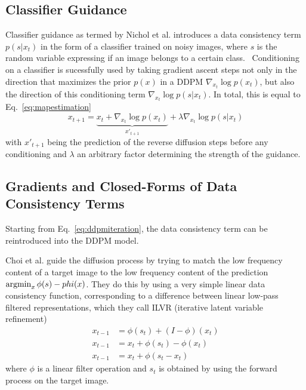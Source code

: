 \subsection{Classifier Guidance}
Classifier guidance as termed by Nichol et al. introduces a data consistency term $p(s|x_t)$ in the form of a classifier trained on noisy images, where $s$ is the random variable expressing if an image belongs to a certain class.~\autocite{dhariwal2021diffusion,sohldickstein2015deep} Conditioning on a classifier is sucessfully used by taking gradient ascent steps not only in the direction that maximizes the prior $p(x)$ in a DDPM $\nabla_{x_t} \log p(x_t)$, but also the direction of this conditioning term $\nabla_{x_t} \log p(s|x_t)$. In total, this is equal to Eq.~\ref{eq:mapestimation}
\begin{equation}
    x_{t+1} = \underbrace{x_{t} + \nabla_{x_t} \log p(x_t)}_{x'_{t+1}} + \lambda \nabla_{x_t} \log p(s|x_t)
\end{equation}
with $x'_{t+1}$ being the prediction of the reverse diffusion steps before any conditioning and $\lambda$ an arbitrary factor determining the strength of the guidance.

\subsection{Gradients and Closed-Forms of Data Consistency Terms}
Starting from Eq.~\ref{eq:ddpmiteration}, the data consistency term can be reintroduced into the DDPM model.

Choi et al. guide the diffusion process by trying to match the low frequency content of a target image to the low frequency content of the prediction $\operatorname*{argmin}_x \phi(s) - phi(x)$. They do this by using a very simple linear data consistency function, corresponding to a difference between linear low-pass filtered representations, which they call ILVR (iterative latent variable refinement)
\begin{align}
    \label{eq:ilvr}
    x_{t-1} & = \phi(s_{t}) + (I - \phi) (x_{t})  \\
    x_{t-1} & = x_{t} + \phi(s_{t}) - \phi(x_{t}) \\
    x_{t-1} & = x_{t} + \phi(s_{t} -x_{t})
\end{align}
where $\phi$ is a linear filter operation and $s_t$ is obtained by using the forward process on the target image.~\autocite{choi2021ilvr}


